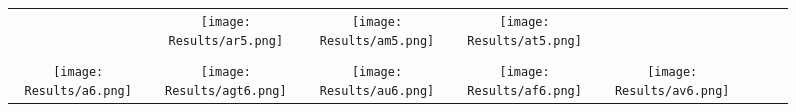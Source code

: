 \documentclass[journal]{IEEEtran}
\begin{document}
\begin{figure*}[!t]
\begin{tabular}{cccccccc}
		&
		\hspace{0.4cm}
		\begin{minipage}{30pt}
			\texttt{[image: Results/ar5.png]}
\end{minipage}
		&
		\hspace{0.4cm}
		\begin{minipage}{30pt}
			\texttt{[image: Results/am5.png]}
\end{minipage}
		&
		\hspace{0.4cm}
		\begin{minipage}{30pt}
			\texttt{[image: Results/at5.png]}
\end{minipage}
		\\
		\\
		\begin{minipage}{30pt}
			\texttt{[image: Results/a6.png]}
			\centering{(a)}
		\end{minipage}
		&
		\hspace{0.4cm}
		\begin{minipage}{30pt}
			\texttt{[image: Results/agt6.png]}
			\centering{(b)}
		\end{minipage}
		&
		\hspace{0.4cm}
		\begin{minipage}{30pt}
			\texttt{[image: Results/au6.png]}
			\centering{(c)}
		\end{minipage}
		&
		\hspace{0.4cm}
		\begin{minipage}{30pt}
			\texttt{[image: Results/af6.png]}
			\centering{(d)}
		\end{minipage}
		&
		\hspace{0.4cm}
		\begin{minipage}{30pt}
			\texttt{[image: Results/av6.png]}
			\centering{(e)}
		\end{minipage}
		

\end{tabular}
\end{figure*}
\end{document}
